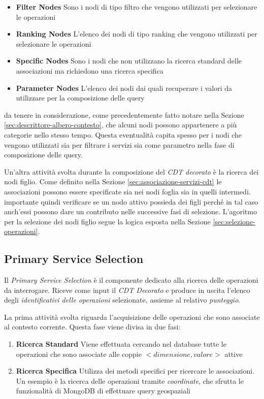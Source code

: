 \begin{itemize}
	\item \textbf{Filter Nodes} Sono i nodi di tipo filtro che vengono utilizzati per selezionare le operazioni
	\item \textbf{Ranking Nodes} L'elenco dei nodi di tipo ranking che vengono utilizzati per selezionare le operazioni
	\item \textbf{Specific Nodes} Sono i nodi che non utilizzano la ricerca standard delle associazioni ma richiedono una ricerca specifica
	\item \textbf{Parameter Nodes} L'elenco dei nodi dai quali recuperare i valori da utilizzare per la composizione delle query
\end{itemize}

\upe da tenere in considerazione, come precedentemente fatto notare nella Sezione \ref{sec:descrittore-albero-contesto}, che alcuni nodi possono appartenere a più categorie nello stesso tempo. Questa eventualità capita spesso per i nodi che vengono utilizzati sia per filtrare i servizi sia come parametro nella fase di composizione delle query.

Un'altra attività svolta durante la composizione del \emph{CDT decorato} è la ricerca dei nodi figlio. Come definito nella Sezione \ref{sec:associazione-servizi-cdt} le associazioni possono essere specificate sia nei nodi foglia sia in quelli intermedi. \upe importante quindi verificare se un nodo attivo possieda dei figli perché in tal caso anch'essi possono dare un contributo nelle successive fasi di selezione. L'agoritmo per la selezione dei nodi figlio segue la logica esposta nella Sezione \ref{sec:selezione-operazioni}.

\subsection{Primary Service Selection\label{sec:primary-service-selection}}

Il \emph{Primary Service Selection} è il componente dedicato alla ricerca delle operazioni da interrogare. Riceve come input il \emph{CDT Decorato} e produce in uscita l'elenco degli \emph{identificativi delle operazioni} selezionate, assieme al relativo \emph{punteggio}.

La prima attività svolta riguarda l'acquisizione delle operazioni che sono associate al contesto corrente. Questa fase viene divisa in due fasi:

\begin{enumerate}
	\item \textbf{Ricerca Standard} Viene effettuata cercando nel database tutte le operazioni che sono associate alle coppie $ {<}dimensione, valore{>} $ attive
	\item \textbf{Ricerca Specifica} Utilizza dei metodi specifici per ricercare le associazioni. Un esempio è la ricerca delle operazioni tramite \emph{coordinate}, che sfrutta le funzionalità di MongoDB di effettuare query geospaziali
\end{enumerate}

